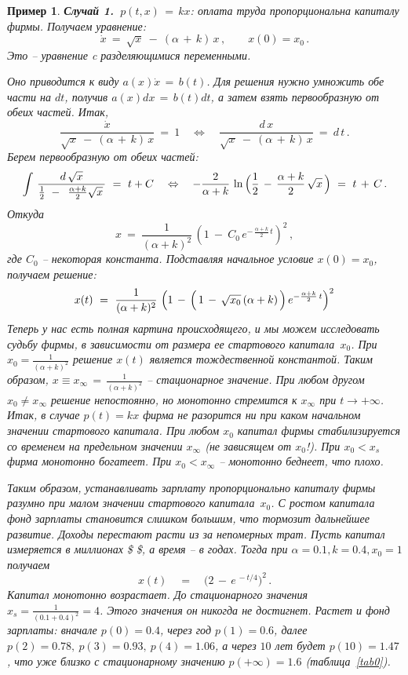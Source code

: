 \documentclass[12pt,a4paper]{article}
\newtheorem{ex}{Пример}
\begin{document}
\begin{ex}
{\textbf{Случай 1.} $\ p(t, x) \, = \, k x$: оплата труда пропорциональна 
капиталу фирмы. Получаем уравнение:   
 $$
\dot x \ = \  \sqrt{x} \ - \ (\alpha \, + \, k)\, x \,  ,\qquad x(0) = x_0\, .  
$$
 Это -- } уравнение c разделяющимися переменными. {\em Оно приводится к виду 
 $a(x)\dot x \, = \, b(t)$. Для решения  нужно умножить обе части 
 на $dt$, получив $a(x)dx \, = \, b(t)dt$, а затем взять первообразную от обеих частей. 
 Итак, 
$$
\frac{\dot x }{\sqrt{x} \ - \ (\alpha \, + \, k)\, x}\ = \ 1\quad \Leftrightarrow \quad 
  \frac{ d\, x }{\sqrt{x} \ - \ (\alpha \, + \, k)\, x}\ = \ d\, t\, . 
$$  
Берем первообразную от обеих частей: 
$$
\int \, \frac{d \, \sqrt{x} }{\frac12 \ - \ \, \frac{\alpha + k}{2}\sqrt{x}\, }\ = \ t + C\quad \Leftrightarrow \quad 
  - \frac{2}{\alpha + k}\, \ln \, 
  \Bigl( \frac12 \, - \, \frac{\alpha + k}{2}\, \sqrt{x}\, \Bigr)\ = \ t\, + \, C\, . 
$$
Откуда 
$$
x\ = \ \frac{1}{(\alpha + k)^2} \, \left( 1 \ - \ C_0 \, e^{- \, \frac{\alpha + k}{2}\, t} \right)^2 \, , 
$$
где $C_0$ -- некоторая константа. 
Подставляя начальное условие $x(0) = x_0$, получаем решение: 
\begin{equation}\label{eq.firm}
x(t)\ = \ \frac{1}{(\alpha + k)^2} \, \left( 1 \, - \, \Bigl(\, 
1 \, - \, \sqrt{x_0}\, (\alpha + k) \, \Bigr) \, e^{- \frac{\alpha + k}{2}\, t} \right)^2 
\end{equation}
Теперь у нас есть полная картина происходящего, и мы можем исследовать 
судьбу фирмы, в зависимости от размера ее стартового капитала~$x_0$. 
При $x_0 = \frac{1}{(\alpha + k)^2}$ решение $x(t)$
является  тождественной константой. Таким образом, $x \equiv x_{\infty} \, = \, 
\frac{1}{(\alpha + k)^2}$ -- 
стационарное значение. При любом другом $x_0\ne x_{\infty}$ решение непостоянно, но монотонно стремится к 
$x_{\infty}$
при $t \to +\infty$. Итак, в случае $p(t) = k x$ фирма не разорится ни при каком начальном значении стартового капитала. При любом $x_0$ капитал фирмы стабилизируется со временем на предельном значении 
$x_{\infty}$ (не зависящем от $x_0$!). При $x_0 < x_s$ фирма монотонно богатеет. При 
$x_0 < x_{\infty}$ -- монотонно беднеет, что плохо.

 Таким образом, устанавливать зарплату пропорционально капиталу фирмы разумно при малом значении стартового капитала~$x_0$. С ростом капитала фонд зарплаты становится слишком большим, что тормозит дальнейшее развитие. Доходы перестают расти из за  непомерных трат.  Пусть капитал измеряется в миллионах 
 \$ \$, а время -- в годах. Тогда при $\alpha = 0.1, k  = 0.4, x_0 = 1$ получаем 
$$
x(t)\quad = \quad  \bigl( 2 \, - \, e^{\, - t/4}\bigr)^2\, . 
$$ 
Капитал монотонно возрастает. До стационарного 
 значения $x_s = \frac{1}{(0.1 + 0.4)^2} = 4$. Этого значения он никогда не достигнет.
Растет и фонд зарплаты: вначале  $p(0) = 0.4$, через год $p(1) = 0.6$, далее 
$p(2) = 0.78, \ p(3) =  0.93 ,\ p(4) = 1.06$, а через $10$ лет будет $p(10) = 1.47$, 
что уже близко с стационарному значению $p(+\infty) = 1.6$ (таблица~\ref{tab0}). 

}
\end{ex}
\end{document}
